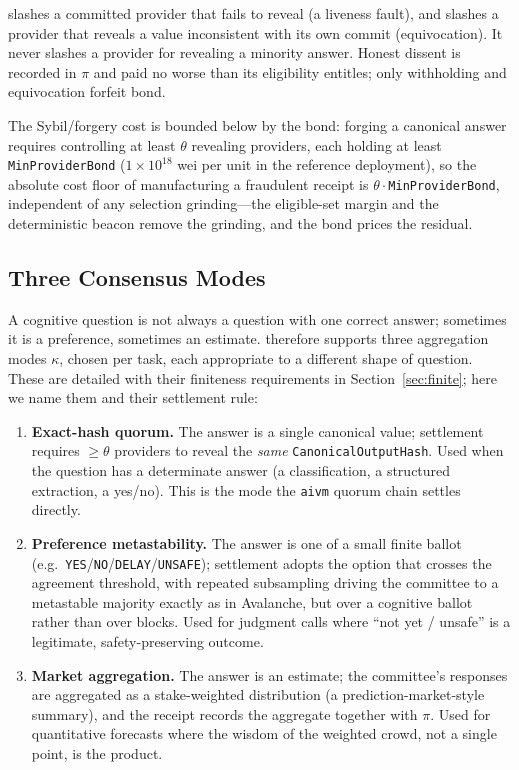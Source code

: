 \begin{principle}
\label{prin:slash}
\SCC{} slashes a committed provider that fails to reveal (a liveness fault), and slashes a provider that reveals a value inconsistent with its own commit (equivocation). It never slashes a provider for revealing a minority answer. Honest dissent is recorded in $\pi$ and paid no worse than its eligibility entitles; only withholding and equivocation forfeit bond.
\end{principle}

The Sybil/forgery cost is bounded below by the bond: forging a canonical answer requires controlling at least $\theta$ revealing providers, each holding at least \texttt{MinProviderBond} ($1{\times}10^{18}$ wei per unit in the reference deployment), so the absolute cost floor of manufacturing a fraudulent receipt is $\theta \cdot$\texttt{MinProviderBond}, independent of any selection grinding---the eligible-set margin and the deterministic beacon remove the grinding, and the bond prices the residual.

\subsection{Three Consensus Modes}
\label{sec:scc-modes}

A cognitive question is not always a question with one correct answer; sometimes it is a preference, sometimes an estimate. \SCC{} therefore supports three aggregation modes $\kappa$, chosen per task, each appropriate to a different shape of question. These are detailed with their finiteness requirements in Section~\ref{sec:finite}; here we name them and their settlement rule:

\begin{enumerate}[leftmargin=2.2em]
\item \textbf{Exact-hash quorum.} The answer is a single canonical value; settlement requires $\ge \theta$ providers to reveal the \emph{same} \texttt{CanonicalOutputHash}. Used when the question has a determinate answer (a classification, a structured extraction, a yes/no). This is the mode the \texttt{aivm} quorum chain settles directly.
\item \textbf{Preference metastability.} The answer is one of a small finite ballot (e.g.\ \texttt{YES}/\texttt{NO}/\texttt{DELAY}/\texttt{UNSAFE}); settlement adopts the option that crosses the agreement threshold, with repeated subsampling driving the committee to a metastable majority exactly as in Avalanche, but over a cognitive ballot rather than over blocks. Used for judgment calls where ``not yet / unsafe'' is a legitimate, safety-preserving outcome.
\item \textbf{Market aggregation.} The answer is an estimate; the committee's responses are aggregated as a stake-weighted distribution (a prediction-market-style summary), and the receipt records the aggregate together with $\pi$. Used for quantitative forecasts where the wisdom of the weighted crowd, not a single point, is the product.
\end{enumerate}

